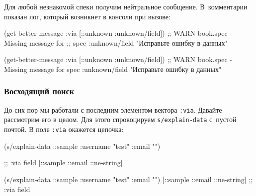 \fi

\noindent
Для любой незнакомой спеки получим нейтральное сообщение. В~комментарии показан
лог, который возникнет в консоли при вызове:

\ifx\DEVICETYPE\MOBILE

  \begin{clojure}
(get-better-message
    {:via [::unknown :unknown/field]})
;; WARN book.spec - Missing message for
;; spec :unknown/field
"Исправьте ошибку в данных"
  \end{clojure}

\else

  \begin{clojure}
(get-better-message {:via [::unknown :unknown/field]})
;; WARN book.spec - Missing message for spec :unknown/field
"Исправьте ошибку в данных"
  \end{clojure}

\fi

\subsubsection{Восходящий поиск}

До сих пор мы работали с последним элементом вектора \verb|:via|. Давайте
рассмотрим его в целом. Для этого спровоцируем \verb|s/explain-data| с~пустой
почтой. В поле \verb|:via| окажется цепочка:

\ifx\DEVICETYPE\MOBILE

\begin{english}
  \begin{clojure}
(s/explain-data ::sample
  {:username "test" :email ""})

;; :via field
[::sample ::email ::ne-string]
  \end{clojure}
\end{english}

\else

\begin{english}
  \begin{clojure}
(s/explain-data ::sample {:username "test" :email ""})
[::sample ::email ::ne-string] ;; :via field
  \end{clojure}
\end{english}

\fi

